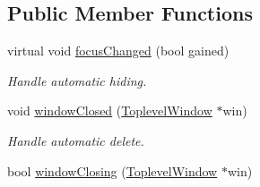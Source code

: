 \subsection*{Public Member Functions}
\begin{DoxyCompactItemize}
\item 
\hypertarget{classGUI_1_1TransientWindow_a233608f207df9a452281145e1086d31c}{virtual void \hyperlink{classGUI_1_1TransientWindow_a233608f207df9a452281145e1086d31c}{focus\-Changed} (bool gained)}\label{classGUI_1_1TransientWindow_a233608f207df9a452281145e1086d31c}

\begin{DoxyCompactList}\small\item\em Handle automatic hiding. \end{DoxyCompactList}\item 
\hypertarget{classGUI_1_1TransientWindow_af9215fcb2e62b8d472bbd5457054f3bc}{void \hyperlink{classGUI_1_1TransientWindow_af9215fcb2e62b8d472bbd5457054f3bc}{window\-Closed} (\hyperlink{classGUI_1_1ToplevelWindow}{Toplevel\-Window} $\ast$win)}\label{classGUI_1_1TransientWindow_af9215fcb2e62b8d472bbd5457054f3bc}

\begin{DoxyCompactList}\small\item\em Handle automatic delete. \end{DoxyCompactList}\item 
\hypertarget{classGUI_1_1TransientWindow_afd212cef088556c0c11b89020bfa64dd}{bool \hyperlink{classGUI_1_1TransientWindow_afd212cef088556c0c11b89020bfa64dd}{window\-Closing} (\hyperlink{classGUI_1_1ToplevelWindow}{Toplevel\-Window} $\ast$win)}\label{classGUI_1_1TransientWindow_afd212cef088556c0c11b89020bfa64dd}


\end{DoxyCompactItemize}
